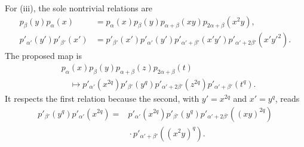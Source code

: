 For (iii), the sole nontrivial relations are
\[
\begin{aligned}
 p_\beta(y)p_\alpha(x)
  &=p_\alpha(x)p_\beta(y)p_{\alpha+\beta}(xy)
    p_{2\alpha+\beta}(x^2y),\\
 p'_{\alpha'}(y')p'_{\beta'}(x')
  &=p'_{\beta'}(x')p'_{\alpha'}(y')
    p'_{\alpha'+\beta'}(x'y')
    p'_{\alpha'+2\beta'}(x'y'^2).
\end{aligned}
\]
The proposed map is
\[
\begin{aligned}
 &p_\alpha(x)p_\beta(y)p_{\alpha+\beta}(z)p_{2\alpha+\beta}(t)\\
 &\quad\longmapsto
 p'_{\alpha'}(x^{2q})p'_{\beta'}(y^q)
 p'_{\alpha'+2\beta'}(z^{2q})p'_{\alpha'+\beta'}(t^q).
\end{aligned}
\]
It respects the first relation because the second, with
\(y'=x^{2q}\) and \(x'=y^q\), reads
\[
\begin{aligned}
 p'_{\beta'}(y^q)p'_{\alpha'}(x^{2q})
  ={}&p'_{\alpha'}(x^{2q})p'_{\beta'}(y^q)
   p'_{\alpha'+2\beta'}((xy)^{2q})\\
   &{}\cdot p'_{\alpha'+\beta'}((x^2y)^q).
\end{aligned}
\]

